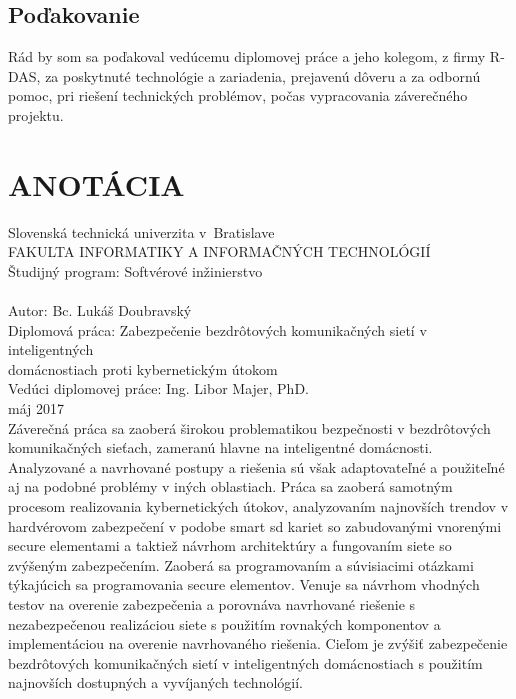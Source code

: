 \documentclass[12pt,a4paper,oneside,openright]{report}
\begin{document}
\section*{Poďakovanie}
Rád by som sa poďakoval vedúcemu diplomovej práce a jeho kolegom, z firmy R-DAS, za poskytnuté technológie a zariadenia, prejavenú dôveru a za odbornú pomoc, pri riešení technických problémov, počas vypracovania záverečného projektu.

\newpage
\thispagestyle{empty}
\mbox{}

\onehalfspacing
\chapter*{ANOTÁCIA}	
\thispagestyle{empty}
\noindent Slovenská technická univerzita v~Bratislave \\
FAKULTA INFORMATIKY A INFORMAČNÝCH TECHNOLÓGIÍ \\
Študijný program: \tabto{4.7cm}Softvérové inžinierstvo \\ \\
Autor: \tabto{4.7cm}Bc. Lukáš Doubravský \\
Diplomová práca: 
\tabto{4.7cm}Zabezpečenie bezdrôtových komunikačných sietí v inteligentných\\ \tabto{4.7cm}domácnostiach proti kybernetickým útokom  \\
Vedúci diplomovej práce: \tabto{4.7cm}Ing. Libor Majer, PhD. \\
máj 2017 \\

Záverečná práca sa zaoberá širokou problematikou bezpečnosti v bezdrôtových komunikačných sieťach, zameranú hlavne na inteligentné domácnosti. Analyzované a navrhované postupy a riešenia sú však adaptovateľné a použiteľné aj na podobné problémy v iných oblastiach.
Práca sa zaoberá samotným procesom realizovania kybernetických útokov, analyzovaním najnovších trendov v hardvérovom zabezpečení v podobe smart sd kariet so zabudovanými vnorenými secure elementami a taktiež návrhom architektúry a fungovaním siete so zvýšeným zabezpečením.
Zaoberá  sa programovaním a súvisiacimi otázkami týkajúcich sa programovania secure elementov.
Venuje sa návrhom vhodných testov na overenie zabezpečenia a porovnáva navrhované riešenie s nezabezpečenou realizáciou siete s použitím rovnakých komponentov a implementáciou na overenie navrhovaného riešenia.
Cieľom je zvýšiť zabezpečenie bezdrôtových komunikačných sietí v inteligentných domácnostiach s použitím najnovších dostupných a vyvíjaných technológií.
\\ \\
\end{document}
